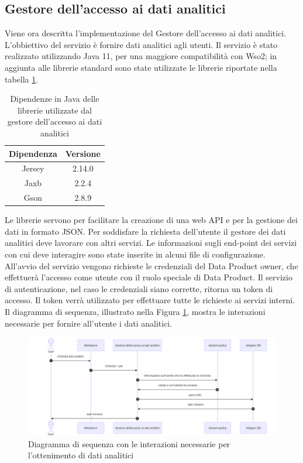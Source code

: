 \documentclass[12pt]{report}
\begin{document}
\subsection{Gestore dell'accesso ai dati analitici}
Viene ora descritta l'implementazione del Gestore dell'accesso ai dati analitici.
L'obbiettivo del servizio è fornire dati analitici agli utenti.
Il servizio è stato realizzato utilizzando Java 11, per una maggiore compatibilità con Wso2; in aggiunta alle librerie standard sono state utilizzate le librerie riportate nella tabella \ref{tab:dependencies}.
\begin{table}[H]
\centering
\begin{tabular}{|c|c|}
    \hline
    Dipendenza & Versione \\
    \hline
    Jersey & 2.14.0 \\
    Jaxb & 2.2.4 \\
    Gson & 2.8.9 \\
    \hline
\end{tabular}
\caption{Dipendenze in Java delle librerie utilizzate dal gestore dell'accesso ai dati analitici}
\label{tab:dependencies}
\end{table}
Le librerie servono per facilitare la creazione di una web API e per la gestione dei dati in formato JSON.
Per soddisfare la richiesta dell'utente il gestore dei dati analitici deve lavorare con altri servizi.
Le informazioni sugli end-point dei servizi con cui deve interagire sono state inserite in alcuni file di configurazione.
All'avvio del servizio vengono richieste le credenziali del Data Product owner, che effettuerà l'accesso come utente con il ruolo speciale di Data Product.
Il servizio di autenticazione, nel caso le credenziali siano corrette, ritorna un token di accesso.
Il token verrà utilizzato per effettuare tutte le richieste ai servizi interni.
Il diagramma di sequenza, illustrato nella Figura \ref{fig:sequenza dati analitici}, mostra le interazioni necessarie per fornire all'utente i dati analitici.
\begin{figure}
    \centering
    \includegraphics[width=\linewidth]{immagini/Gestore Dati analtici.png}
    \caption{Diagramma di sequenza con le interazioni necessarie per l'ottenimento di dati analitici}
    \label{fig:sequenza dati analitici}
\end{figure}
\end{document}
